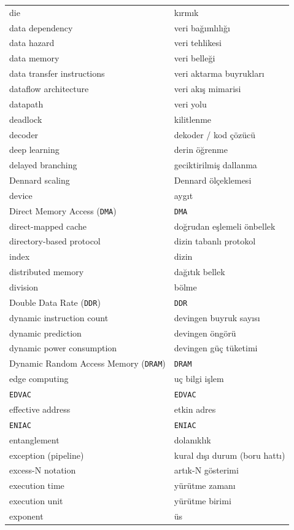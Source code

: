 {\begin{longtable}{@{}p{7.6cm}p{7.6cm}@{}}
die & kırmık \\
data dependency & veri bağımlılığı \\
data hazard & veri tehlikesi \\
data memory & veri belleği \\
data transfer instructions & veri aktarma buyrukları \\
dataflow architecture & veri akış mimarisi \\
datapath & veri yolu \\
deadlock & kilitlenme \\
decoder & dekoder / kod çözücü \\
deep learning & derin öğrenme \\
delayed branching & geciktirilmiş dallanma \\
Dennard scaling & Dennard ölçeklemesi \\
device & aygıt \\
Direct Memory Access (\texttt{DMA}) & \texttt{DMA} \\
direct-mapped cache & doğrudan eşlemeli önbellek \\
directory-based protocol & dizin tabanlı protokol \\
index & dizin \\
distributed memory & dağıtık bellek \\
division & bölme \\
Double Data Rate (\texttt{DDR}) & \texttt{DDR} \\
dynamic instruction count & devingen buyruk sayısı \\
dynamic prediction & devingen öngörü \\
dynamic power consumption & devingen güç tüketimi \\
Dynamic Random Access Memory (\texttt{DRAM}) & \texttt{DRAM} \\

edge computing & uç bilgi işlem \\
\texttt{EDVAC} & \texttt{EDVAC} \\
effective address & etkin adres \\
\texttt{ENIAC} & \texttt{ENIAC} \\
entanglement & dolanıklık \\
exception (pipeline) & kural dışı durum (boru hattı) \\
excess-N notation & artık-N gösterimi \\
execution time & yürütme zamanı \\
execution unit & yürütme birimi \\
exponent & üs \\


\end{longtable}}
